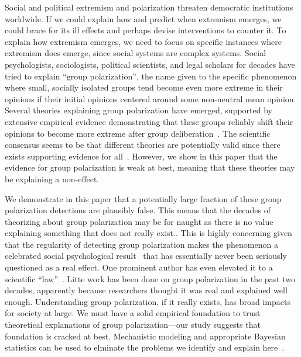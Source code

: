 Social and political extremism and polarization threaten democratic 
institutions worldwide. If we could explain how and predict when extremism
emerges, we could brace for its ill effects and perhaps devise interventions
to counter it. To explain how extremism emerges, we need to focus on specific
instances where extremism does emerge, since social systems are complex systems.
Social psychologists, sociologists, political scientists, and legal
scholars for decades have tried to explain ``group polarization'', 
the name given to the specific phenomenon where small, 
socially isolated groups tend become even more extreme in their opinions if their
initial opinions centered around some non-neutral mean opinion.  Several 
theories explaining group polarization have emerged, supported by extensive
empirical evidence demonstrating that these groups reliably shift their opinions
to become more extreme after group 
deliberation~\cite{Brown1986,Brown2000,Schkade2010,Sieber2019}. The scientific consensus seems
to be that different theories are potentially valid since there exists 
supporting evidence for all~\cite{Brown2000}. However, we show in this paper
that the evidence for group polarization is weak at best, meaning that these
theories may be explaining a non-effect.

We demonstrate in this paper that a potentially 
large fraction of these group polarization detections are
plausibly false. This means that the decades of theorizing about 
group polarization may be for naught as there is no value explaining something
that does not really exist.. 
This is highly concerning given that the regularity of detecting
group polarization makes the phenomenon a celebrated social 
psychological result~\cite{Brown1986,Brown2000} that has essentially never
been seriously questioned as a real effect. One prominent author has even elevated it
to a scientific ``law''~\cite{Sunstein2002}. Litte work has been done
on group polarization in the past two decades, apparently because researchers 
thought it was real and explained well enough.  
Understanding group polarization, if it really exists, has broad impacts for 
society at large. We must have a solid empirical foundation to trust theoretical 
explanations of group polarization---our study suggests that foundation is
cracked at best.  
Mechanistic modeling and appropriate Bayesian statistics can be used
to elminate the problems we identify and explain here~\cite{Kruschke2018,Kruschke2018a,Turner2021}.

